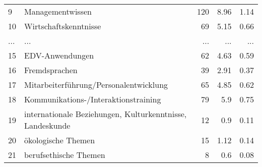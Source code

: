 \begin{longtable}{lXrrr}
        9 & \multicolumn{1}{X}{Managementwissen} & %
          \num{120} &
          \num[round-mode=places,round-precision=2]{8,96} &
          \num[round-mode=places,round-precision=2]{1,14} \\
        10 & \multicolumn{1}{X}{Wirtschaftskenntnisse} & %
          \num{69} &
          \num[round-mode=places,round-precision=2]{5,15} &
          \num[round-mode=places,round-precision=2]{0,66} \\
       ... & ... & ... & ... & ... \\
        15 & \multicolumn{1}{X}{EDV-Anwendungen} & %
          \num{62} &
          \num[round-mode=places,round-precision=2]{4,63} &
          \num[round-mode=places,round-precision=2]{0,59} \\

        16 & \multicolumn{1}{X}{Fremdsprachen} & %
          \num{39} &
          \num[round-mode=places,round-precision=2]{2,91} &
          \num[round-mode=places,round-precision=2]{0,37} \\

        17 & \multicolumn{1}{X}{Mitarbeiterführung/Personalentwicklung} & %
          \num{65} &
          \num[round-mode=places,round-precision=2]{4,85} &
          \num[round-mode=places,round-precision=2]{0,62} \\

        18 & \multicolumn{1}{X}{Kommunikations-/Interaktionstraining} & %
          \num{79} &
          \num[round-mode=places,round-precision=2]{5,9} &
          \num[round-mode=places,round-precision=2]{0,75} \\

        19 & \multicolumn{1}{X}{internationale Beziehungen, Kulturkenntnisse, Landeskunde} & %
          \num{12} &
          \num[round-mode=places,round-precision=2]{0,9} &
          \num[round-mode=places,round-precision=2]{0,11} \\

        20 & \multicolumn{1}{X}{ökologische Themen} & %
          \num{15} &
          \num[round-mode=places,round-precision=2]{1,12} &
          \num[round-mode=places,round-precision=2]{0,14} \\

        21 & \multicolumn{1}{X}{berufsethische Themen} & %
          \num{8} &
          \num[round-mode=places,round-precision=2]{0,6} &
          \num[round-mode=places,round-precision=2]{0,08} \\


\end{longtable}

